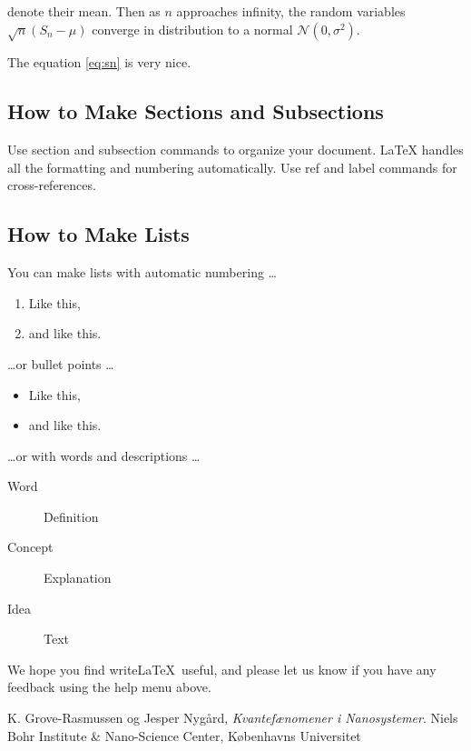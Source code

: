 \documentclass[a4paper]{article}
\begin{document}
denote their mean. Then as $n$ approaches infinity, the random variables $\sqrt{n}(S_n - \mu)$ converge in distribution to a normal $\mathcal{N}(0, \sigma^2)$.

The equation \ref{eq:sn} is very nice.

\subsection{How to Make Sections and Subsections}

Use section and subsection commands to organize your document. \LaTeX{} handles all the formatting and numbering automatically. Use ref and label commands for cross-references.

\subsection{How to Make Lists}

You can make lists with automatic numbering \dots

\begin{enumerate}
\item Like this,
\item and like this.
\end{enumerate}
\dots or bullet points \dots
\begin{itemize}
\item Like this,
\item and like this.
\end{itemize}
\dots or with words and descriptions \dots
\begin{description}
\item[Word] Definition
\item[Concept] Explanation
\item[Idea] Text
\end{description}

We hope you find write\LaTeX\ useful, and please let us know if you have any feedback using the help menu above.

\begin{thebibliography}{9}
  K. Grove-Rasmussen og Jesper Nygård,
  \emph{Kvantefænomener i Nanosystemer}.
  Niels Bohr Institute \& Nano-Science Center, Københavns Universitet

\end{thebibliography}
\fi
\end{document}
